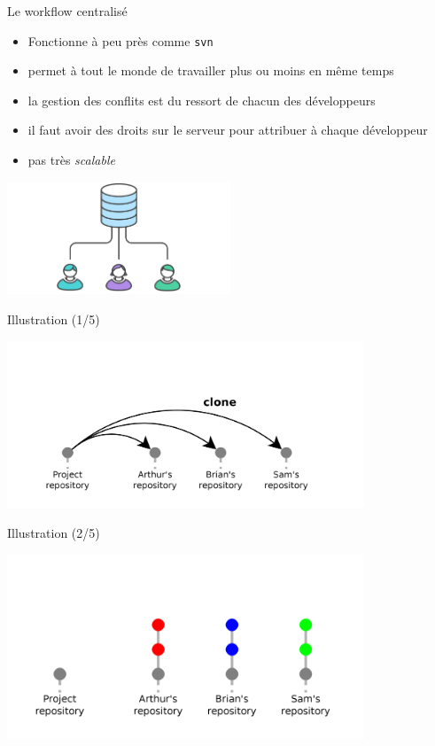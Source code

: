 \begin{frame}[fragile]{%
\protect\hypertarget{le-workflow-centralisuxe9}{%
Le workflow centralisé}}

\begin{itemize}
\tightlist
\item
  Fonctionne à peu près comme \texttt{svn}
\item
  permet à tout le monde de travailler plus ou moins en même temps
\item
  la gestion des conflits est du ressort de chacun des développeurs
\item
  il faut avoir des droits sur le serveur pour attribuer à chaque
  développeur
\item
  pas très \emph{scalable}
\end{itemize}

\includegraphics[width=0.5\textwidth]{images/centralise.pdf}

\end{frame}

\begin{frame}{%
\protect\hypertarget{illustration-15}{%
Illustration (1/5)}}

\includegraphics[width=0.8\textwidth]{images/centralise-1.png}

\end{frame}

\begin{frame}{%
\protect\hypertarget{illustration-25}{%
Illustration (2/5)}}

\includegraphics[width=0.8\textwidth]{images/centralise-2.png}

\end{frame}

